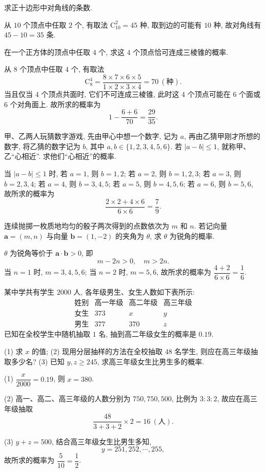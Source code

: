 \begin{exercise}
    求正十边形中对角线的条数.
\end{exercise}
\beginsolution
    从 $10$ 个顶点中任取 $2$ 个, 有取法 $\mathrm{C}_{10}^2= 45$ 种, 取到边的可能有 $10$ 种, 故对角线有 $45-10= 35$ 条. 
\endsolution

\begin{exercise}
    在一个正方体的顶点中任取 $4$ 个, 求这 $4$ 个顶点恰可连成三棱锥的概率.
\end{exercise}
\beginsolution
    从 $8$ 个顶点中任取 $4$ 个, 有取法
    \[\mathrm{C}_8^4= \frac{8\times 7\times 6\times 5}{1\times 2\times 3\times 4}= 70\ (\text{种}).\]
    当且仅当 $4$ 个顶点共面时, 它们不可连成三棱锥, 此时这 $4$ 个顶点可能在 $6$ 个面或 $6$ 个对角面上. 故所求的概率为
    \[1- \frac{6+6}{70}= \frac{29}{35}.\]
\endsolution

\begin{exercise}
    甲、乙两人玩猜数字游戏, 先由甲心中想一个数字, 记为 $a$, 再由乙猜甲刚才所想的数字, 将乙猜的数字记为 $b$, 其中 $a, b\in\{1, 2, 3, 4, 5, 6\}$. 若 $|a-b|\leqslant1$, 就称甲、乙“心相近”. 求他们“心相近”的概率.
\end{exercise}
\beginsolution
    当 $|a-b|\leqslant1$ 时, 若 $a=1$, 则 $b=1,2$; 若 $a=2$, 则 $b=1,2,3$; 若 $a=3$, 则 $b=2,3,4$; 若 $a=4$, 则 $b=3,4,5$; 若 $a=5$, 则 $b=4,5,6$; 若 $a=6$, 则 $b=5,6$, 故所求的概率为
    \[\frac{2\times 2+ 4\times 6}{6\times 6}= \frac79.\]
\endsolution

\begin{exercise}
    连续抛掷一枚质地均匀的骰子两次得到的点数依次为 $m$ 和 $n$. 若记向量 $\bm{a}=(m, n)$ 与向量 $\bm{b}=(1, -2)$ 的夹角为 $\theta$, 求 $\theta$ 为锐角的概率.
\end{exercise}
\beginsolution
    $\theta$ 为锐角等价于 $\bm{a}\cdot\bm{b}> 0$, 即
    \[m-2n>0,\quad m>2n.\]
    当 $n=1$ 时, $m=3,4,5,6$; 当 $n=2$ 时, $m=5,6$, 故所求的概率为 $\dfrac{4+2}{6\times 6}= \dfrac16$.
\endsolution

\begin{exercise}
    某中学共有学生 $2000$ 人, 各年级男生、女生人数如下表所示:
    \[\begin{array}{c|ccc}
        \text{姓别} & \text{高一年级} &\text{高二年级} &\text{高三年级}\\\hline
        \text{女生} & 373 & x & y \\
        \text{男生} & 377 & 370 & z
      \end{array}\]
    已知在全校学生中随机抽取 $1$ 名, 抽到高二年级女生的概率是 $0.19$.
    
    (1) 求 $x$ 的值;\qquad
    (2) 现用分层抽样的方法在全校抽取 $48$ 名学生, 则应在高三年级抽取多少名?\qquad
    (3) 已知 $y,z\geqslant 245$, 求高三年级女生比男生多的概率.
\end{exercise}
\beginsolution
    (1) $\dfrac{x}{2000}= 0.19$, 则 $x=380$.

    (2) 高一、高二、高三年级的人数分别为 $750,750,500$, 比例为 $3:3:2$, 故应在高三年级抽取
    \[\frac{48}{3+3+2}\times 2= 16\ (\text{人}).\]

    (3) $y+z= 500$, 结合高三年级女生比男生多知, 
    \[y=251,252,\cdots,255,\]
    故所求的概率为 $\dfrac5{10}= \dfrac12$.
\endsolution
